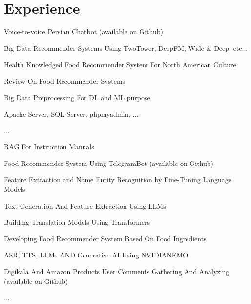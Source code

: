 \documentclass[a4paper]{deedy-resume} %
\begin{document}
\begin{minipage}[t]{0.66\textwidth} %


\section{Experience}



\vspace{\topsep} %
\begin{tightitemize}
\item Voice-to-voice Persian Chatbot (available on Github)
\item Big Data Recommender Systems Using TwoTower, DeepFM, Wide \& Deep, etc...
\item Health Knowledged Food Recommender System For North American Culture
\item Review On Food Recommender Systems
\item Big Data Preprocessing For DL and ML purpose
\item Apache Server, SQL Server, phpmyadmin, ...
\item ...
\end{tightitemize}

\sectionspace %



\vspace{\topsep} %
\begin{tightitemize}
\item RAG For Instruction Manuals
\item Food Recommender System Using TelegramBot (available on Github)
\item Feature Extraction and Name Entity Recognition by Fine-Tuning Language Models
\item Text Generation And Feature Extraction Using LLMs
\item Building Translation Models Using Transformers
\item Developing Food Recommender System Based On Food Ingredients 
\item ASR, TTS, LLMs AND Generative AI Using NVIDIA\texttrademark NEMO 
\item Digikala And Amazon Products User Comments Gathering And Analyzing (available on Github)
\item ...


\end{tightitemize}
\end{minipage}
\end{document}
